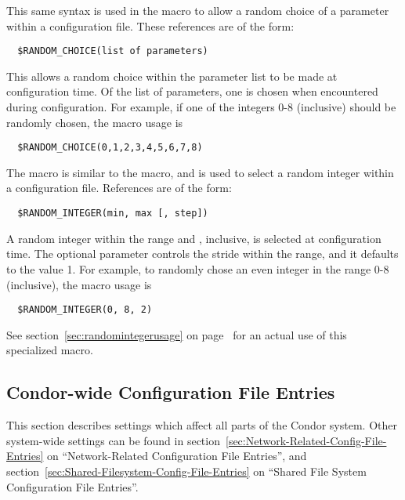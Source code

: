 This same syntax is used in the  macro to
allow a random choice of a parameter
within a configuration file.
These references are of the form:
\begin{verbatim}
  $RANDOM_CHOICE(list of parameters)
\end{verbatim}
This allows a random choice within the parameter list to be made
at configuration time.  Of the list of parameters, one is
chosen when encountered during configuration.  For example,
if one of the integers 0-8 (inclusive) should be randomly
chosen, the macro usage is
\begin{verbatim}
  $RANDOM_CHOICE(0,1,2,3,4,5,6,7,8)
\end{verbatim}

The  macro is similar to the 
macro, and is used to select a random integer within a configuration file.
References are of the form:
\begin{verbatim}
  $RANDOM_INTEGER(min, max [, step])
\end{verbatim}
A random integer within the range \verb@min@ and \verb@max@, inclusive,
is selected at configuration time.
The optional \verb@step@ parameter
controls the stride within the range, and it defaults to the value 1.
For example, to randomly chose an even integer in the range 0-8 (inclusive),
the macro usage is
\begin{verbatim}
  $RANDOM_INTEGER(0, 8, 2)
\end{verbatim}

See section~\ref{sec:randomintegerusage} on
page~\pageref{sec:randomintegerusage}
for an actual use of this specialized macro.
\subsection{\label{sec:Condor-wide-Config-File-Entries}Condor-wide Configuration File Entries} 


This section describes settings which affect all parts of the Condor
system. 
Other system-wide settings can be found in
section~\ref{sec:Network-Related-Config-File-Entries} on
``Network-Related Configuration File Entries'', and
section~\ref{sec:Shared-Filesystem-Config-File-Entries} on ``Shared
File System Configuration File Entries''. 

